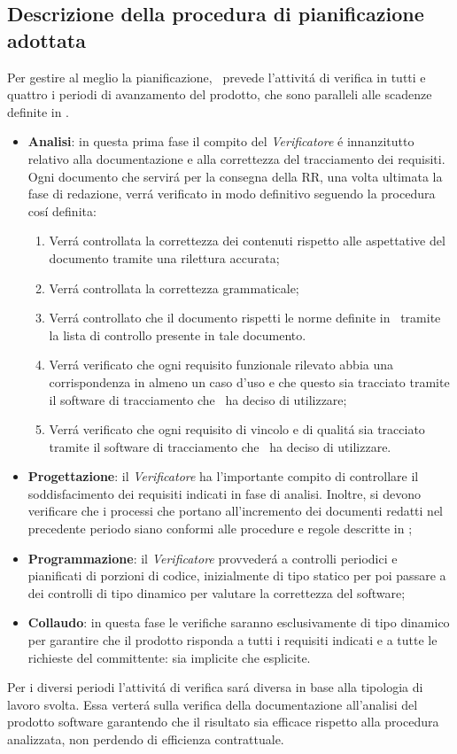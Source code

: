 \subsection{Descrizione della procedura di pianificazione adottata}
Per gestire al meglio la pianificazione, \gruppo ~prevede l'attivit\'a di verifica in tutti e quattro i periodi di avanzamento del prodotto, che sono paralleli alle scadenze definite in \infoPDP.
\begin{itemize}
\item \textbf{Analisi}: in questa prima fase il compito del \textit{Verificatore} \'e innanzitutto relativo alla documentazione e alla correttezza del tracciamento dei requisiti. Ogni documento che servir\'a per la consegna della RR, una volta ultimata la fase di redazione, verr\'a verificato in modo definitivo seguendo la procedura cos\'i definita:
\begin{enumerate}
\item Verr\'a controllata la correttezza dei contenuti rispetto alle aspettative del documento tramite una rilettura accurata;
\item Verr\'a controllata la correttezza grammaticale;
\item Verr\'a controllato che il documento rispetti le norme definite in \infoNDP ~tramite la lista di controllo presente in tale documento.
\item Verr\'a verificato che ogni requisito funzionale rilevato abbia una corrispondenza in almeno un caso d'uso e che questo sia tracciato tramite il software di tracciamento che \gruppo ~ha deciso di utilizzare;
\item Verr\'a verificato che ogni requisito di vincolo e di qualit\'a sia tracciato tramite il software di tracciamento che \gruppo ~ha deciso di utilizzare.
\end{enumerate}
\item \textbf{Progettazione}: il \textit{Verificatore} ha l'importante compito di controllare il soddisfacimento dei requisiti indicati in fase di analisi. Inoltre, si devono verificare che i processi che portano all'incremento dei documenti redatti nel precedente periodo siano conformi alle procedure e regole descritte in \infoNDP;
\item \textbf{Programmazione}: il \textit{Verificatore} provveder\'a a controlli periodici e pianificati di porzioni di codice, inizialmente di tipo statico per poi passare a dei controlli di tipo dinamico per valutare la correttezza del software;
\item \textbf{Collaudo}: in questa fase le verifiche saranno esclusivamente di tipo dinamico per garantire che il prodotto risponda a tutti i requisiti indicati e a tutte le richieste del committente: sia implicite che esplicite.
\end{itemize}
Per i diversi periodi l'attivit\'a di verifica sar\'a diversa in base alla tipologia di lavoro svolta. Essa verter\'a sulla verifica della documentazione all'analisi del prodotto software garantendo che il risultato sia efficace rispetto alla procedura analizzata, non perdendo di efficienza contrattuale. 
